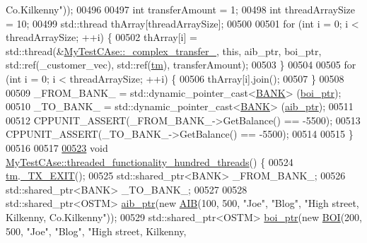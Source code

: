 \begin{DoxyCode}
{       Co.Kilkenny"}));
00496     
00497     \textcolor{keywordtype}{int} transferAmount = 1;
00498     \textcolor{keywordtype}{int} threadArraySize = 10; 
00499     std::thread thArray[threadArraySize];
00500 
00501     \textcolor{keywordflow}{for} (\textcolor{keywordtype}{int} i = 0; i < threadArraySize; ++i) \{
00502         thArray[i] = std::thread(&\hyperlink{class_my_test_c_ase_a2367b87338c4f61cc3ac3193651580d4_a2367b87338c4f61cc3ac3193651580d4}{MyTestCAse::\_complex\_transfer\_}, \textcolor{keyword}{this}, 
      aib\_ptr, boi\_ptr, std::ref(\_customer\_vec),  std::ref(\hyperlink{class_my_test_c_ase_a422e6e5d4ddedea384be96031c89b72b_a422e6e5d4ddedea384be96031c89b72b}{tm}), transferAmount);
00503     \}
00504     
00505     \textcolor{keywordflow}{for} (\textcolor{keywordtype}{int} i = 0; i < threadArraySize; ++i) \{
00506         thArray[i].join();
00507     \}
00508     
00509     \_FROM\_BANK\_ = std::dynamic\_pointer\_cast<\hyperlink{class_b_a_n_k}{BANK}> (\hyperlink{class_my_test_c_ase_a5554de9e3e6393a89c66c036c529720b_a5554de9e3e6393a89c66c036c529720b}{boi\_ptr});
00510     \_TO\_BANK\_ = std::dynamic\_pointer\_cast<\hyperlink{class_b_a_n_k}{BANK}> (\hyperlink{class_my_test_c_ase_adad50e8278b64aa0321000b528e5362c_adad50e8278b64aa0321000b528e5362c}{aib\_ptr});
00511     
00512     CPPUNIT\_ASSERT(\_FROM\_BANK\_->GetBalance() == -5500);
00513     CPPUNIT\_ASSERT(\_TO\_BANK\_->GetBalance() == -5500);
00514     
00515 \}
00516 
00517 
\hypertarget{_my_test_c_ase_8cpp_source.tex_l00523}{}\hyperlink{class_my_test_c_ase_afdb39bda80c1305ac1c4cc0e5ce022f4_afdb39bda80c1305ac1c4cc0e5ce022f4}{00523} \textcolor{keywordtype}{void} \hyperlink{class_my_test_c_ase_afdb39bda80c1305ac1c4cc0e5ce022f4_afdb39bda80c1305ac1c4cc0e5ce022f4}{MyTestCAse::threaded\_functionality\_hundred\_threads}()
      \{
00524     \hyperlink{class_my_test_c_ase_a422e6e5d4ddedea384be96031c89b72b_a422e6e5d4ddedea384be96031c89b72b}{tm}.\hyperlink{class_t_m_a5e2d1127f2429f2f524d25f430eade06_a5e2d1127f2429f2f524d25f430eade06}{\_TX\_EXIT}();
00525     std::shared\_ptr<BANK> \_FROM\_BANK\_;
00526     std::shared\_ptr<BANK> \_TO\_BANK\_;
00527     
00528     std::shared\_ptr<OSTM> \hyperlink{class_my_test_c_ase_adad50e8278b64aa0321000b528e5362c_adad50e8278b64aa0321000b528e5362c}{aib\_ptr}(\textcolor{keyword}{new} \hyperlink{class_a_i_b}{AIB}(100, 500, \textcolor{stringliteral}{"Joe"}, \textcolor{stringliteral}{"Blog"}, \textcolor{stringliteral}{"High street, Kilkenny,
       Co.Kilkenny"}));
00529     std::shared\_ptr<OSTM> \hyperlink{class_my_test_c_ase_a5554de9e3e6393a89c66c036c529720b_a5554de9e3e6393a89c66c036c529720b}{boi\_ptr}(\textcolor{keyword}{new} \hyperlink{class_b_o_i}{BOI}(200, 500, \textcolor{stringliteral}{"Joe"}, \textcolor{stringliteral}{"Blog"}, \textcolor{stringliteral}{"High street, Kilkenny,
}
\end{DoxyCode}
